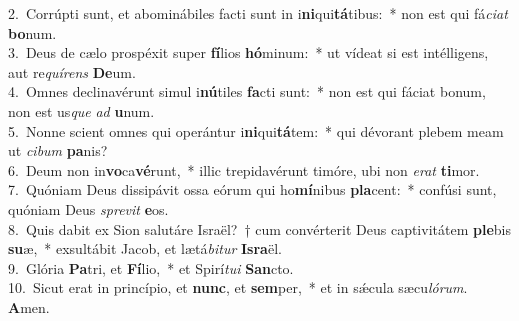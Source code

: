 {2.~}Corrúpti sunt, et abominábiles facti sunt in i\textbf{ni}qui\textbf{tá}tibus:~* non est qui fá\textit{ci}\textit{at} \textbf{bo}num.\\
{3.~}Deus de cælo prospéxit super \textbf{fí}lios \textbf{hó}minum:~* ut vídeat si est intélligens, aut re\textit{quí}\textit{rens} \textbf{De}um.\\
{4.~}Omnes declinavérunt simul i\textbf{nú}tiles \textbf{fa}cti sunt:~* non est qui fáciat bonum, non est us\textit{que} \textit{ad} \textbf{u}num.\\
{5.~}Nonne scient omnes qui operántur i\textbf{ni}qui\textbf{tá}tem:~* qui dévorant plebem meam ut \textit{ci}\textit{bum} \textbf{pa}nis?\\
{6.~}Deum non in\textbf{vo}ca\textbf{vé}runt,~* illic trepidavérunt timóre, ubi non \textit{e}\textit{rat} \textbf{ti}mor.\\
{7.~}Quóniam Deus dissipávit ossa eórum qui ho\textbf{mí}nibus \textbf{pla}cent:~* confúsi sunt, quóniam Deus \textit{spre}\textit{vit} \textbf{e}os.\\
{8.~}Quis dabit ex Sion salutáre Israël?~† cum convérterit Deus captivitátem \textbf{ple}bis \textbf{su}æ,~* exsultábit Jacob, et lætá\textit{bi}\textit{tur} \textbf{Is}\textbf{ra}ël.\\
{9.~}Glória \textbf{Pa}tri, et \textbf{Fí}lio,~* et Spirí\textit{tu}\textit{i} \textbf{San}cto.\\
{10.~}Sicut erat in princípio, et \textbf{nunc}, et \textbf{sem}per,~* et in sǽcula sæcu\textit{ló}\textit{rum}. \textbf{A}men.\\
